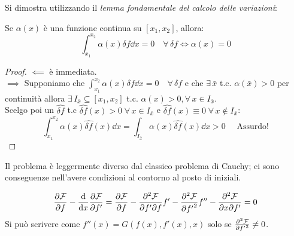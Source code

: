 Si dimostra utilizzando il \textit{lemma fondamentale del calcolo delle variazioni}:
\begin{lemma}
    Se $\alpha(x)$ è una funzione continua su $[x_1,x_2]$, allora:
    \begin{equation}
        \int_{x_1}^{x_2} \alpha(x)\delta f \dd{x}= 0 \quad \forall\,\delta f  \iff \alpha(x)=0
    \end{equation}
\end{lemma}
\begin{proof}
    $\impliedby$ è immediata.\\
    $\implies$ Supponiamo che $\int_{x_1}^{x_2} \alpha(x)\delta f \dd{x}= 0 \quad \forall\,\delta f$ 
    e che $\exists\,\bar{x}$ t.c. $\alpha(\bar{x})>0$ per continuità allora $\exists\,I_{\bar{x}}\subseteq[x_1,x_2]$ t.c. $\alpha(x)>0, \forall\,x\in I_{\bar{x}}$.\\
    Scelgo poi un $\hat{\delta f}$ t.c $\hat{\delta f}(x)>0 \;\forall\,x\in I_{\bar{x}}$ e $\hat{\delta f}(x)\equiv 0 \;\forall\,x \notin I_{\bar{x}} $:
    \begin{equation*}
        \int_{x_1}^{x_2}\alpha(x)\hat{\delta f}(x)\dd{x}= \int_{I_{\bar{x}}} \alpha(x)\hat{\delta f}(x)\dd{x}>0 \quad\text{ Assurdo!}
    \end{equation*}
\end{proof}


\begin{remark}
Il problema è leggermente diverso dal classico problema di Cauchy;
 ci sono conseguenze nell'avere condizioni al contorno al posto di iniziali.
\end{remark}

\begin{remark}
    \begin{equation*}
        \pdv{\mathcal{F}}{f} - \dv{x} \pdv{\mathcal{F}}{f'} 
        = \pdv{\mathcal{F}}{f} - \pdv[2]{\mathcal{F}}{f'}{f} f' 
        - \pdv[2]{\mathcal{F}}{{f'}} f'' 
        - \pdv[2]{\mathcal{F}}{x}{f'} = 0  
    \end{equation*}
    Si può scrivere come \( f''(x) = G(f(x), f'(x), x) \) solo se \( \pdv[2]{\mathcal{F}}{{f'}}\neq 0 \).
\end{remark}

